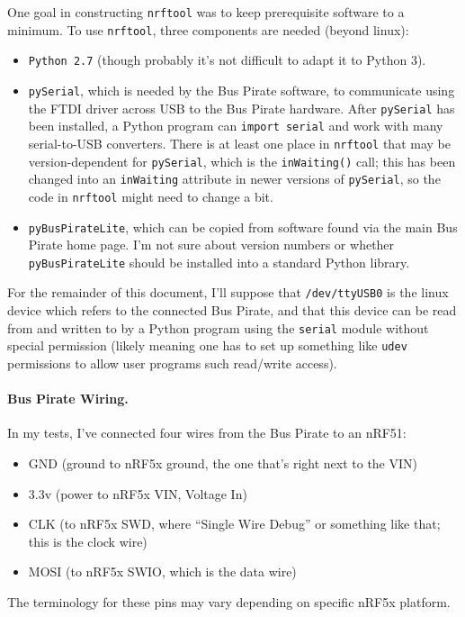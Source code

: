 \documentclass{article}
\begin{document}
One goal in constructing \texttt{nrftool} was to keep prerequisite software to a minimum. To use 
\texttt{nrftool}, three components are needed (beyond linux):
\begin{itemize}
\item \texttt{Python 2.7} (though probably it's not difficult to adapt it to Python 3).
\item \texttt{pySerial}, which is needed by the Bus Pirate software, to communicate using  
the FTDI driver across USB to the Bus Pirate hardware. After \texttt{pySerial} has been installed,
a Python program can \texttt{import serial} and work with many serial-to-USB converters. 
There is at least one place in \texttt{nrftool}
that may be version-dependent for \texttt{pySerial}, which is the \texttt{inWaiting()} call; this has
been changed into an \texttt{inWaiting} attribute in newer versions of \texttt{pySerial}, so the 
code in \texttt{nrftool} might need to change a bit.  
\item \texttt{pyBusPirateLite}, which can be copied from software found via the main Bus Pirate home page. 
I'm not sure about version numbers or whether \texttt{pyBusPirateLite} should be installed into a 
standard Python library.  
\end{itemize}
For the remainder of this document, I'll suppose that \texttt{/dev/ttyUSB0} is the linux device 
which refers to the connected Bus Pirate, and that this device can be read from and written 
to by a Python program using the \texttt{serial} module without special permission 
(likely meaning one has to set up something 
like \texttt{udev} permissions to allow user programs such read/write access).
\par
\paragraph{Bus Pirate Wiring.} In my tests, I've connected four wires from the Bus Pirate to an nRF51:
\begin{itemize}
\item GND (ground to nRF5x ground, the one that's right next to the VIN)
\item 3.3v (power to nRF5x VIN, Voltage In)
\item CLK (to nRF5x SWD, where ``Single Wire Debug'' or something like that; this is the clock wire) 
\item MOSI (to nRF5x SWIO, which is the data wire) 
\end{itemize}
The terminology for these pins may vary depending on specific nRF5x platform.
\end{document}
